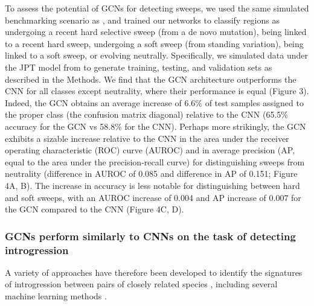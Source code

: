 To assess the potential of GCNs for detecting sweeps, we used the same simulated benchmarking scenario as \cite{flagelUnreasonableEffectivenessConvolutional2019}, and trained our networks to classify regions as undergoing a recent hard selective sweep (from a de novo mutation), being linked to a recent hard sweep, undergoing a soft sweep (from standing variation), being linked to a soft sweep, or evolving neutrally. Specifically, we simulated data under the JPT model from \cite{schriderSoftSweepsAre2017} to generate training, testing, and validation sets as described in the Methods. We find that the GCN architecture outperforms the CNN for all classes except neutrality, where their performance is equal (Figure 3). Indeed, the GCN obtains an average increase of 6.6\% of test samples assigned to the proper class (the confusion matrix diagonal) relative to the CNN (65.5\% accuracy for the GCN vs 58.8\% for the CNN). Perhaps more strikingly, the GCN exhibits a sizable increase relative to the CNN in the area under the receiver operating characteristic (ROC) curve (AUROC) and in average precision (AP, equal to the area under the precision-recall curve) for distinguishing sweeps from neutrality (difference in AUROC of 0.085 and difference in AP of 0.151; Figure 4A, B). The increase in accuracy is less notable for distinguishing between hard and soft sweeps, with an AUROC increase of 0.004 and AP increase of 0.007 for the GCN compared to the CNN (Figure 4C, D). 


\subsubsection{GCNs perform similarly to CNNs on the task of detecting introgression}

A variety of approaches have therefore been developed to identify the signatures of introgression between pairs of closely related species \cite{hudsonEstimationLevelsGene1992,husonReconstructionReticulateNetworks2005,rosenzweigPowerfulMethodsDetecting2016}, including several machine learning methods \cite{gowerDetectingAdaptiveIntrogression2021,rayIntroUNETIdentifyingIntrogressed2023,schriderSupervisedMachineLearning2018a,schriderSupervisedMachineLearning2018a}.

